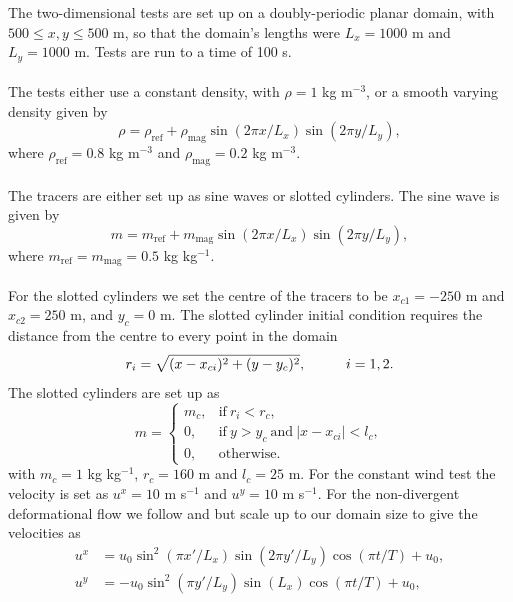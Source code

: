 \documentclass{ametsocV6.1}
\begin{document}
The two-dimensional tests are set up on a doubly-periodic planar domain, with $500 \leq x,y \leq 500$ m, so that the domain's lengths were $L_x=1000$ m and $L_y=1000$ m.
Tests are run to a time of 100 s.
\\
\\
The tests either use a constant density, with $\rho=1$ kg m$^{-3}$, or a smooth varying density given by
\begin{equation}
    \rho = \rho_{\mathrm{ref}} + \rho_{\mathrm{mag}} \sin(2 \pi x/L_x) \sin(2 \pi y/L_y),
\end{equation}
where $\rho_{\mathrm{ref}}=0.8$ kg m$^{-3}$ and $\rho_{\mathrm{mag}}=0.2$ kg m$^{-3}$. \\ 
\\
The tracers are either set up as sine waves or slotted cylinders. The sine wave is given by
\begin{equation}
    m = m_{\mathrm{ref}} + m_{\mathrm{mag}} \sin(2 \pi x/L_x) \sin(2 \pi y/L_y),
\end{equation} 
where $m_{\mathrm{ref}}=m_{\mathrm{mag}}=0.5$ kg kg$^{-1}$. \\
\\
For the slotted cylinders we set the centre of the tracers to be $x_{c1} = -250$ m and $x_{c2}=250$ m, and $y_c=0$ m.
The slotted cylinder initial condition requires the distance from the centre to every point in the domain
\begin{equation}
    r_i = \sqrt{(x-x_{ci})^2+(y-y_c)^2}, \hspace*{1cm} i=1,2.
\end{equation}
The slotted cylinders are set up as
\begin{equation}
    m = 
    \begin{cases}
        m_c, & \mathrm{if} \ r_i < r_c, \\
        0, & \mathrm{if} \ y>y_c \ \mathrm{and} \ |x-x_{ci}|<l_c, \\
        0, & \mathrm{otherwise}.
    \end{cases}
\end{equation}
with $m_c=1$ kg kg$^{-1}$, $r_c=160$ m and $l_c=25$ m.
For the constant wind test the velocity is set as $u^x=10$ m s$^{-1}$ and $u^y=10$ m s$^{-1}$. For the non-divergent deformational flow we follow \cite{skamarock2006limiters} and \citet{kent2020positive} but scale up to our domain size to give the velocities as
\begin{subequations}
\begin{align}
u^x & =  u_0 \sin^2(\pi x'/L_x)\sin(2 \pi y'/L_y)\cos(\pi t/T)+u_0,\\ 
u^y & = -u_0 \sin^2(\pi y'/L_y)\sin(L_x)\cos(\pi t/T)+u_0,
\end{align}
\end{subequations}
\end{document}
